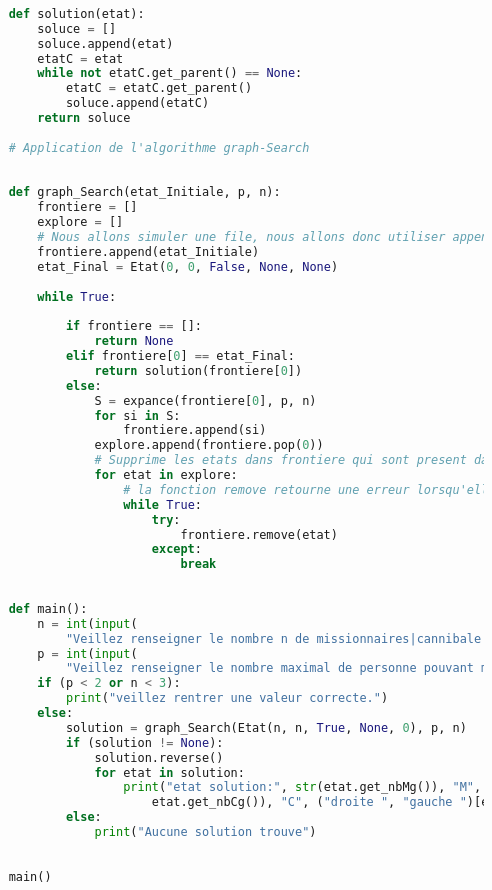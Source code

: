 \documentclass[a4paper, 12pt, french]{book}
\begin{document}
\begin{lstlisting}[language=Python, caption=Python example]
    
    def solution(etat):
        soluce = []
        soluce.append(etat)
        etatC = etat
        while not etatC.get_parent() == None:
            etatC = etatC.get_parent()
            soluce.append(etatC)
        return soluce
    
    # Application de l'algorithme graph-Search
    
    
    def graph_Search(etat_Initiale, p, n):
        frontiere = []
        explore = []
        # Nous allons simuler une file, nous allons donc utiliser append qui rajoute l'objet en fin de file et l'etat choisie a expancer sera celui en t^te de file (donc a la position 0)
        frontiere.append(etat_Initiale)
        etat_Final = Etat(0, 0, False, None, None)
    
        while True:
    
            if frontiere == []:
                return None
            elif frontiere[0] == etat_Final:
                return solution(frontiere[0])
            else:
                S = expance(frontiere[0], p, n)
                for si in S:
                    frontiere.append(si)
                explore.append(frontiere.pop(0))
                # Supprime les etats dans frontiere qui sont present dans eplorer (donc les etas deja expance)
                for etat in explore:
                    # la fonction remove retourne une erreur lorsqu'elle ne trouve pas l'element a supprimer dans la file. On va donc capter cette erreur pour eviter de faire "while etat in frontiere". Ce qui nous obligerais a chaque fois de parcourire la file pour s'avoir s'il y a un etat correspondant a "etat".
                    while True:
                        try:
                            frontiere.remove(etat)
                        except:
                            break
    
    
    def main():
        n = int(input(
            "Veillez renseigner le nombre n de missionnaires|cannibale a faires traverser (minimum 3): "))
        p = int(input(
            "Veillez renseigner le nombre maximal de personne pouvant monter sur le bateau (au mininimum 2) : "))
        if (p < 2 or n < 3):
            print("veillez rentrer une valeur correcte.")
        else:
            solution = graph_Search(Etat(n, n, True, None, 0), p, n)
            if (solution != None):
                solution.reverse()
                for etat in solution:
                    print("etat solution:", str(etat.get_nbMg()), "M", str(
                        etat.get_nbCg()), "C", ("droite ", "gauche ")[etat.get_boatPosition()], str(etat.get_cout()))
            else:
                print("Aucune solution trouve")
    
    
    main()
    
\end{lstlisting}

\backmatter
\end{document}
